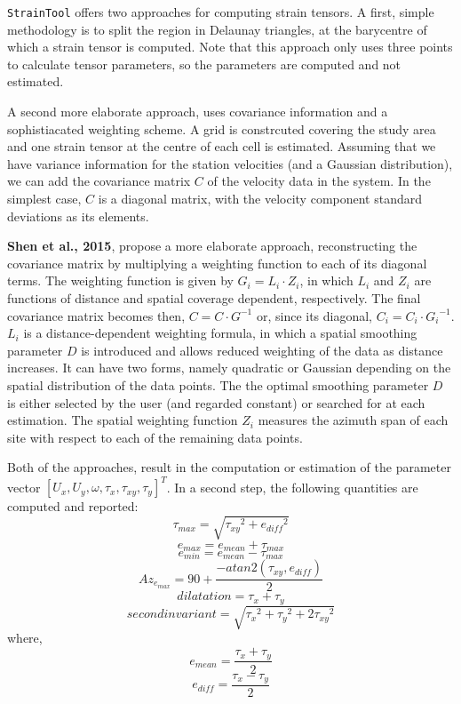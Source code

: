 \documentclass[landscape,a0paper,fontscale=0.324]{baposter} %
\begin{document}
\begin{poster}
{\texttt{StrainTool} offers two approaches for computing strain tensors. A first, 
simple methodology is to split the region in Delaunay triangles, at the barycentre 
of which a strain tensor is computed. Note that this approach only uses three points 
to calculate tensor parameters, so the parameters are computed and not estimated.

A second more elaborate approach, uses covariance information and a sophistiacated
weighting scheme. A grid is constrcuted covering the study area and one strain 
tensor at the centre of each cell is estimated.
Assuming that we have variance information for the station velocities 
(and a Gaussian distribution), we can add the covariance matrix \(C\) of the 
velocity data in the system. In the simplest case, \(C\) is a diagonal matrix, 
with the velocity component standard deviations as its elements.

\textbf{Shen et al., 2015}, propose a more elaborate approach, reconstructing the
covariance matrix by multiplying a weighting function to each of its diagonal terms.
The weighting function is given by \(G_i = L_i \cdot Z_i\), in which \(L_i\) and \(Z_i\)
are functions of distance and spatial coverage dependent, respectively.
The final covariance matrix becomes then, \(C = C \cdot G^{-1}\) or, since its diagonal,
\(C_i = C_i \cdot {G_i}^{-1}\).
\(L_i\) is a distance-dependent weighting formula, in which a spatial smoothing 
parameter \(D\) is introduced and allows reduced weighting of the data as distance 
increases. It can have two forms, namely quadratic or Gaussian depending on the
spatial distribution of the data points. The the optimal smoothing parameter \(D\) 
is either selected by the user (and regarded constant) or searched for at each 
estimation.
The spatial weighting function \(Z_i\) measures the azimuth span of each site 
with respect to each of the remaining data points.

Both of the approaches, result in the computation or estimation of the parameter vector 
\([U_{x}, U_{y}, \omega, \tau_{x}, \tau_{xy}, \tau_{y}]^T\). In a second step, the
following quantities are computed and reported:
$$ \tau_{max}= \sqrt{ {\tau_{xy}}^2 + {e_{diff}}^2 } $$
$$ e_{max}  = e_{mean} + \tau_{max} $$
$$ e_{min}  = e_{mean} - \tau_{max} $$
$$ Az_{e_{max}}  = 90 + \frac{-atan2(\tau_{xy}, e_{diff})}{2} $$
$$ dilatation = \tau_{x} + \tau_{y} $$
$$ second invariant = \sqrt{ {\tau_{x}}^2 + {\tau_{y}}^2 + 2{\tau_{xy}}^2  }$$
where,
$$ e_{mean} = \frac{\tau_{x}+\tau_{y}}{2} $$
$$ e_{diff} = \frac{\tau_{x}-\tau_{y}}{2} $$
}


\end{poster}
\end{document}
